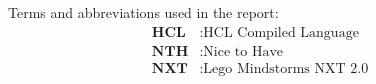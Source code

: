 
Terms and abbreviations used in the report:
\begin{align*}
	\textbf{HCL} &: \text{HCL Compiled Language} \\
    \textbf{NTH} &: \text{Nice to Have} \\
    \textbf{NXT} &: \text{Lego Mindstorms NXT 2.0} \\
   
\end{align*}
